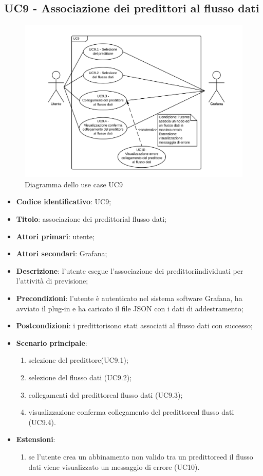 \subsection{UC9 - Associazione dei predittori al flusso dati}
\begin{figure}[H]
\includegraphics[width=\textwidth,height=\textheight,keepaspectratio]{img/UC9_-_Associazione_dei_predittori_al_flusso_dati.png}
\caption{Diagramma dello use case UC9}
\end{figure}
\begin{itemize}
	\item \textbf{Codice identificativo}: UC9;
	\item \textbf{Titolo}: associazione dei predittori\glosp al flusso dati;
	\item \textbf{Attori primari}: utente;
	\item \textbf{Attori secondari}: Grafana\glo;
	\item \textbf{Descrizione}: l'utente esegue l'associazione dei predittori\glosp individuati per l'attività di previsione;
	\item \textbf{Precondizioni}: l'utente è autenticato nel sistema software Grafana\glo, ha avviato il plug-in e ha caricato il file JSON con i dati di addestramento;
	\item \textbf{Postcondizioni}: i predittori\glosp sono stati associati al flusso dati con successo;
	\item \textbf{Scenario principale}: 
		\begin{enumerate}
			\item selezione del predittore\glosp (UC9.1);
			\item selezione del flusso dati (UC9.2);
			\item collegamenti del predittore\glosp al flusso dati (UC9.3);
			\item visualizzazione conferma collegamento del predittore\glosp al flusso dati (UC9.4).
		\end{enumerate}
	\item \textbf{Estensioni}:
		\begin{enumerate}
			\item se l'utente crea un abbinamento non valido tra un predittore\glosp ed il flusso dati viene visualizzato un messaggio di errore (UC10).
		\end{enumerate}
\end{itemize}

